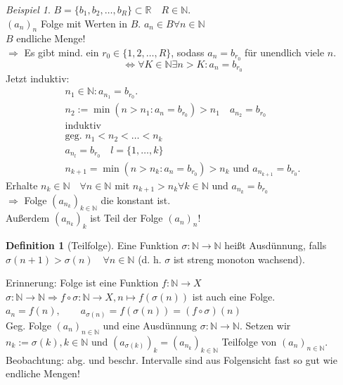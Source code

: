 \documentclass[12pt,a4paper,titlepage]{article} %
\theoremstyle{definition}
\newtheorem{defi}[satz]{Definition}
\theoremstyle{remark}
\newtheorem*{bsp}{Beispiel}
\newcommand{\N}{\mathbb{N}}
\newcommand{\R}{\mathbb{R}}
\begin{document}
\begin{bsp}
	\(B= \{b_1, b_2,\ldots,b_R \} \subset \R \quad R\in\N \).\\
	\( (a_n)_n \) Folge mit Werten in \(B\).
	\(a_n \in B \forall n\in\N \)\\
	\(B\) endliche Menge!\\
	\( \Rightarrow \) Es gibt mind. ein \(r_0 \in \{1,2,\ldots,R\} \), sodass \( a_n=b_{r_0}  \) für unendlich viele \(n\).\\
	\[ \Leftrightarrow \forall K\in\N \exists n>K : a_n = b_{r_0} \]
	Jetzt induktiv: \\
	\begin{align*}
		n_1 \in\N: a_{n_1} = b_{r_0}.\\
		n_2 := \min (n>n_1:a_n=b_{r_0}) >n_1 \quad a_{n_2} = b_{r_0}\\
		\text{induktiv}\\
		\text{geg. } n_1 < n_2<\ldots<n_k\\
		a_{n_l} = b_{r_0} \quad l = \{1, \ldots,k \}\\
		n_{k+1} = \min(n>n_k:a_n = b_{r_0}) > n_k \text{ und } a_{n_{k+1}} = b_{r_0}.
	\end{align*}
	Erhalte \(n_k\in\N \quad \forall n\in\N \) mit \( n_{k+1} > n_k \forall k\in\N \) und \( a_{n_k} = b_{r_0} \)\\
	\( \Rightarrow \) Folge \( (a_{n_k})_{k\in\N} \) die konstant ist.\\
	Außerdem \( (a_{n_k})_k \) ist Teil der Folge \( (a_n)_n \)!
\end{bsp}
\begin{defi}[Teilfolge]
	Eine Funktion \( \sigma:\N \rightarrow\N \) heißt Ausdünnung, falls \( \sigma (n+1) > \sigma(n) \quad \forall n\in\N \) (d. h. \(\sigma\) ist streng monoton wachsend).
\end{defi}
Erinnerung: Folge ist eine Funktion \(f: \N\rightarrow X \)\\
\( \sigma : \N\rightarrow\N \Rightarrow f \circ \sigma : \N\rightarrow X, n\mapsto f(\sigma(n))  \) ist auch eine Folge.\\
\(a_n = f(n),\qquad a_{\sigma(n)} = f(\sigma(n)) = (f\circ\sigma)(n) \)\\
Geg. Folge \( (a_n)_{n\in\N} \) und eine Ausdünnung \( \sigma : \N\rightarrow \N. \) Setzen wir \( n_k := \sigma (k), k\in\N \) und \( (a_{\sigma(k)})_k = (a_{n_k})_{k\in\N} \) Teilfolge von \( (a_n)_{n\in\N} \).\\
Beobachtung: abg. und beschr. Intervalle sind aus Folgensicht fast so gut wie endliche Mengen!
\end{document}

